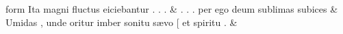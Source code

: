 \documentclass[12pt,onecolumn,twoside,a4paper]{memoir}
\begin{document}
               \begin{pairs}
                  \begin{Leftside}
			\beginnumbering
			\setcounter{stanzaL}{0}
                     
                         \stanza {}
                     form
                              Ita
                              magni
                              fluctus
                              eiciebantur
                              .
                              .
                              . \&
                         \stanza {}.
                              .
                              .
                              per
                              ego
                              deum
                              sublimas
                              subices & 
                     Umidas
                              ,
                              unde
                              oritur
                              imber
                              sonitu
                              sævo
                              [
                              et
                              spiritu
                              . \&
                         \stanza {}
                     

\end{Leftside}
\end{pairs}
\end{document}
